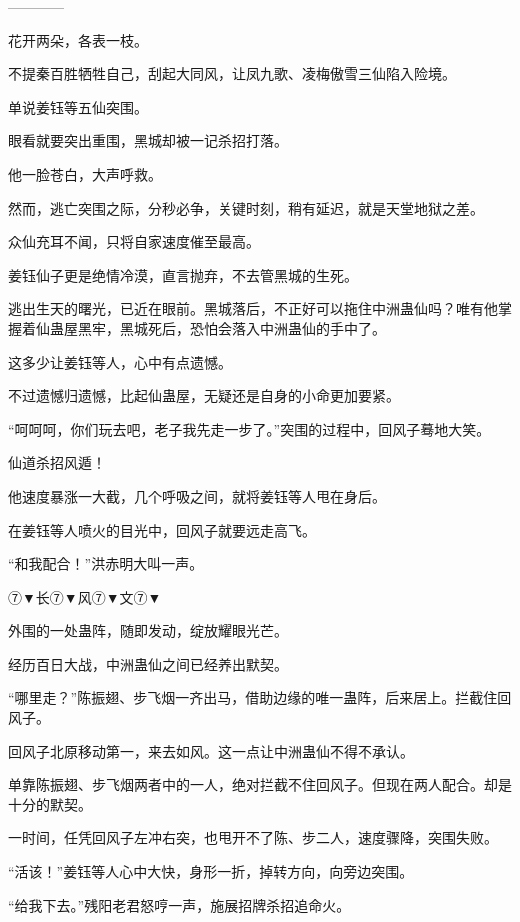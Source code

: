
\begin{this_body}

------------

花开两朵，各表一枝。

不提秦百胜牺牲自己，刮起大同风，让凤九歌、凌梅傲雪三仙陷入险境。

单说姜钰等五仙突围。

眼看就要突出重围，黑城却被一记杀招打落。

他一脸苍白，大声呼救。

然而，逃亡突围之际，分秒必争，关键时刻，稍有延迟，就是天堂地狱之差。

众仙充耳不闻，只将自家速度催至最高。

姜钰仙子更是绝情冷漠，直言抛弃，不去管黑城的生死。

逃出生天的曙光，已近在眼前。黑城落后，不正好可以拖住中洲蛊仙吗？唯有他掌握着仙蛊屋黑牢，黑城死后，恐怕会落入中洲蛊仙的手中了。

这多少让姜钰等人，心中有点遗憾。

不过遗憾归遗憾，比起仙蛊屋，无疑还是自身的小命更加要紧。

“呵呵呵，你们玩去吧，老子我先走一步了。”突围的过程中，回风子蓦地大笑。

仙道杀招风遁！

他速度暴涨一大截，几个呼吸之间，就将姜钰等人甩在身后。

在姜钰等人喷火的目光中，回风子就要远走高飞。

“和我配合！”洪赤明大叫一声。

⑦▼长⑦▼风⑦▼文⑦▼

外围的一处蛊阵，随即发动，绽放耀眼光芒。

经历百日大战，中洲蛊仙之间已经养出默契。

“哪里走？”陈振翅、步飞烟一齐出马，借助边缘的唯一蛊阵，后来居上。拦截住回风子。

回风子北原移动第一，来去如风。这一点让中洲蛊仙不得不承认。

单靠陈振翅、步飞烟两者中的一人，绝对拦截不住回风子。但现在两人配合。却是十分的默契。

一时间，任凭回风子左冲右突，也甩开不了陈、步二人，速度骤降，突围失败。

“活该！”姜钰等人心中大快，身形一折，掉转方向，向旁边突围。

“给我下去。”残阳老君怒哼一声，施展招牌杀招追命火。


\end{this_body}
